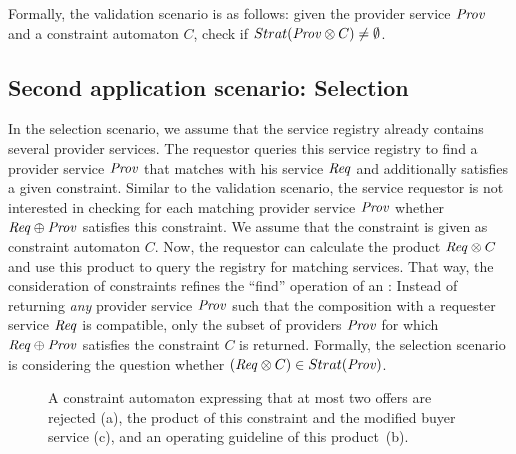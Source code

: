 Formally, the validation scenario is as follows: given the provider service $\mathit{Prov}$ and a constraint automaton $C$, check if $\mathop{Strat}(\mathit{Prov}\otimes C)\neq\emptyset$.

\enlargethispage*{\baselineskip}


\subsection*{Second application scenario: Selection}

In the selection scenario, we assume that the service registry already contains several provider services. The requestor queries this service registry to find a provider service $\mathit{Prov}$ that matches with his service $\mathit{Req}$ and additionally satisfies a given constraint. Similar to the validation scenario, the service requestor is not interested in checking for each matching provider service $\mathit{Prov}$ whether $\mathit{Req}\oplus \mathit{Prov}$ satisfies this constraint. We assume that the constraint is given as constraint automaton $C$. Now, the requestor can calculate the product $\mathit{Req}\otimes C$ and use this product to query the registry for matching services. That way, the consideration of constraints refines the ``find'' operation of an : Instead of returning \emph{any} provider service $\mathit{Prov}$ such that the composition with a requester service $\mathit{Req}$ is compatible, only the subset of providers $\mathit{Prov}$ for which $\mathit{Req} \oplus \mathit{Prov}$ satisfies the constraint $C$ is returned. Formally, the selection scenario is considering the question whether $(\mathit{Req}\otimes C)\in\mathop{Strat}(\mathit{Prov})$.

\begin{figure}[t]
\centering
{}\hspace{4em}
\caption{A constraint automaton expressing that at most two offers are rejected (a), the product of this constraint and the modified buyer service (c), and an operating guideline of this product~(b).}
\label{validation:fig:example1}
\end{figure}


